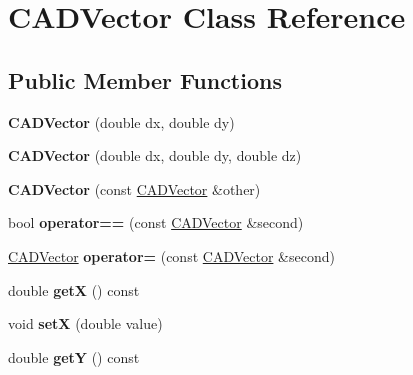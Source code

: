 \hypertarget{class_c_a_d_vector}{}\section{C\+A\+D\+Vector Class Reference}
\label{class_c_a_d_vector}
\subsection*{Public Member Functions}
\begin{DoxyCompactItemize}
\item 
{\bfseries C\+A\+D\+Vector} (double dx, double dy)\hypertarget{class_c_a_d_vector_a0d012ba650b9dffb2a12b223337b6537}{}\label{class_c_a_d_vector_a0d012ba650b9dffb2a12b223337b6537}

\item 
{\bfseries C\+A\+D\+Vector} (double dx, double dy, double dz)\hypertarget{class_c_a_d_vector_a4b9f0058d925a65ffc35ab812a32284e}{}\label{class_c_a_d_vector_a4b9f0058d925a65ffc35ab812a32284e}

\item 
{\bfseries C\+A\+D\+Vector} (const \hyperlink{class_c_a_d_vector}{C\+A\+D\+Vector} \&other)\hypertarget{class_c_a_d_vector_afd78436692fd3437114c590f35454de0}{}\label{class_c_a_d_vector_afd78436692fd3437114c590f35454de0}

\item 
bool {\bfseries operator==} (const \hyperlink{class_c_a_d_vector}{C\+A\+D\+Vector} \&second)\hypertarget{class_c_a_d_vector_a6ee9ee0cd9d6c4e591c22384b222f81a}{}\label{class_c_a_d_vector_a6ee9ee0cd9d6c4e591c22384b222f81a}

\item 
\hyperlink{class_c_a_d_vector}{C\+A\+D\+Vector} {\bfseries operator=} (const \hyperlink{class_c_a_d_vector}{C\+A\+D\+Vector} \&second)\hypertarget{class_c_a_d_vector_a471ca58567cdf7ab6075f31b0673cc8e}{}\label{class_c_a_d_vector_a471ca58567cdf7ab6075f31b0673cc8e}

\item 
double {\bfseries getX} () const \hypertarget{class_c_a_d_vector_a630dcbf5c369688196ebded212db3e7c}{}\label{class_c_a_d_vector_a630dcbf5c369688196ebded212db3e7c}

\item 
void {\bfseries setX} (double value)\hypertarget{class_c_a_d_vector_a40d4e41a8d1a2bac3a63874ceea2546f}{}\label{class_c_a_d_vector_a40d4e41a8d1a2bac3a63874ceea2546f}

\item 
double {\bfseries getY} () const \hypertarget{class_c_a_d_vector_a98153b72ec18676354c1e6b4849cf737}{}\label{class_c_a_d_vector_a98153b72ec18676354c1e6b4849cf737}


\end{DoxyCompactItemize}
